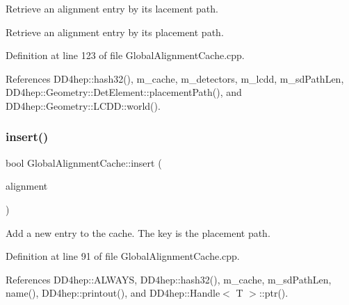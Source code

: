 Retrieve an alignment entry by its lacement path. 

Retrieve an alignment entry by its placement path. 

Definition at line 123 of file Global\+Alignment\+Cache.\+cpp.



References D\+D4hep\+::hash32(), m\+\_\+cache, m\+\_\+detectors, m\+\_\+lcdd, m\+\_\+sd\+Path\+Len, D\+D4hep\+::\+Geometry\+::\+Det\+Element\+::placement\+Path(), and D\+D4hep\+::\+Geometry\+::\+L\+C\+D\+D\+::world().

\hypertarget{class_d_d4hep_1_1_alignments_1_1_global_alignment_cache_a023ee1b04bc17e8be3a8225f79316daf}{}\label{class_d_d4hep_1_1_alignments_1_1_global_alignment_cache_a023ee1b04bc17e8be3a8225f79316daf} 
\subsubsection{\texorpdfstring{insert()}{insert()}}
{\footnotesize\ttfamily bool Global\+Alignment\+Cache\+::insert (\begin{DoxyParamCaption}\item[{\hyperlink{class_d_d4hep_1_1_alignments_1_1_global_alignment}{Global\+Alignment}}]{alignment }\end{DoxyParamCaption})\hspace{0.3cm}{\ttfamily [protected]}}



Add a new entry to the cache. The key is the placement path. 



Definition at line 91 of file Global\+Alignment\+Cache.\+cpp.



References D\+D4hep\+::\+A\+L\+W\+A\+YS, D\+D4hep\+::hash32(), m\+\_\+cache, m\+\_\+sd\+Path\+Len, name(), D\+D4hep\+::printout(), and D\+D4hep\+::\+Handle$<$ T $>$\+::ptr().

\hypertarget{class_d_d4hep_1_1_alignments_1_1_global_alignment_cache_a3ab52f93597d2c6facf29a0ecea5c7a2}{}\label{class_d_d4hep_1_1_alignments_1_1_global_alignment_cache_a3ab52f93597d2c6facf29a0ecea5c7a2} 
